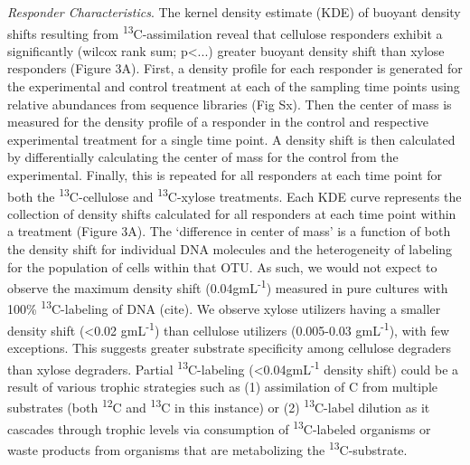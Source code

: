 \textit{Responder Characteristics}. The kernel density estimate (KDE) of buoyant density shifts resulting from \textsuperscript{13}C-assimilation reveal that cellulose responders exhibit a significantly (wilcox rank sum; p\textless...) greater buoyant density shift than xylose responders (Figure 3A). First, a density profile for each responder is generated for the experimental and control treatment at each of the sampling time points using relative abundances from sequence libraries (Fig Sx). Then the center of mass is measured for the density profile of a responder in the control and respective experimental treatment for a single time point. A density shift is then calculated by differentially calculating the center of mass for the control from the experimental. Finally, this is repeated for all responders at each time point for both the \textsuperscript{13}C-cellulose and \textsuperscript{13}C-xylose treatments. Each KDE curve represents the collection of density shifts calculated for all responders at each time point within a treatment (Figure 3A). The ‘difference in center of mass’ is a function of both the density shift for individual DNA molecules and the heterogeneity of labeling for the population of cells within that OTU. As such, we would not expect to observe the maximum density shift (0.04gmL\textsuperscript{-1}) measured in pure cultures with 100\% \textsuperscript{13}C-labeling of DNA (cite). We observe xylose utilizers having a smaller density shift (\textless0.02 gmL\textsuperscript{-1}) than cellulose utilizers (0.005-0.03 gmL\textsuperscript{-1}), with few exceptions. This suggests greater substrate specificity among cellulose degraders than xylose degraders. Partial \textsuperscript{13}C-labeling (\textless 0.04gmL\textsuperscript{-1} density shift) could be a result of various trophic strategies such as (1) assimilation of C from multiple substrates (both \textsuperscript{12}C and \textsuperscript{13}C in this instance) or (2) \textsuperscript{13}C-label dilution as it cascades through trophic levels via consumption of \textsuperscript{13}C-labeled organisms or waste products from organisms that are metabolizing the \textsuperscript{13}C-substrate.


